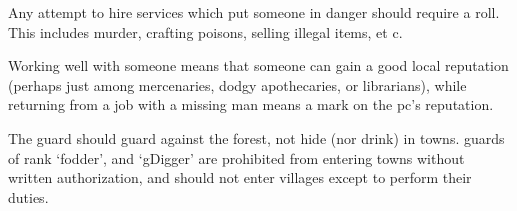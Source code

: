 \begin{multicols}{2}

Any attempt to hire services which put someone in danger should require a roll.
This includes murder, crafting poisons, selling illegal items, et c.

Working well with someone means that someone can gain a good local reputation (perhaps just among mercenaries, dodgy apothecaries, or librarians), while returning from a job with a missing man means a mark on the \gls{pc}'s reputation.

The \gls{guard} should guard against the forest, not hide (nor drink) in towns.
\Glspl{guard} of rank `\gls{fodder}', and `\gls{gDigger}' are prohibited from entering towns without written authorization, and should not enter \glspl{village} except to perform their duties.



\end{multicols}
